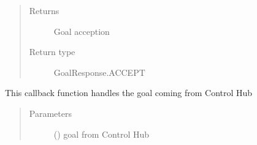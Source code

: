 \documentclass[letterpaper,10pt,english]{sphinxmanual}
\begin{document}
\begin{fulllineitems}
\begin{fulllineitems}
\begin{quote}
\begin{description}
\item[{Returns}] \leavevmode
Goal acception

\item[{Return type}] \leavevmode
GoalResponse.ACCEPT

\end{description}\end{quote}

\end{fulllineitems}


\begin{fulllineitems}
\label{\detokenize{index:Test_Robot.test_robot.test_robot.test_robot_server.GPIOActionServer.handle_accepted_callback}}
This callback function handles the goal coming from Control Hub
\begin{quote}\begin{description}
\item[{Parameters}] \leavevmode
{} () \textendash{} goal from Control Hub

\end{description}\end{quote}

\end{fulllineitems}


\end{fulllineitems}

\end{document}
